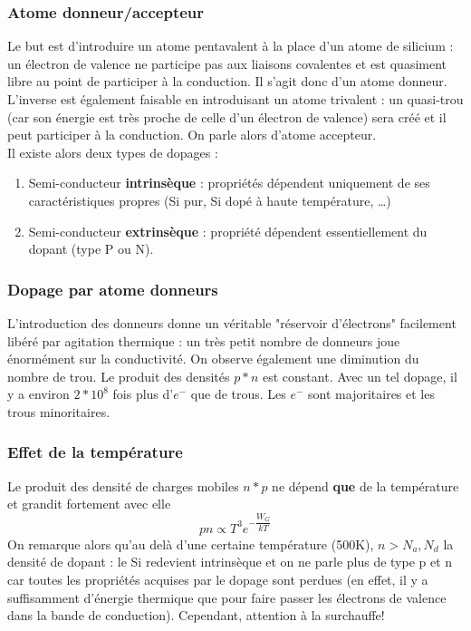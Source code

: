 		\subsubsection{Atome donneur/accepteur}
		Le but est d'introduire un atome pentavalent à la place d'un atome de 
		silicium : un électron de valence ne participe pas aux liaisons 
		covalentes et est quasiment libre au point de participer à la conduction. 
		Il s'agit donc d'un atome donneur. L'inverse est également faisable en 
		introduisant un atome trivalent : un quasi-trou (car son énergie est 
		très proche de celle d'un électron de valence) sera créé et il peut 
		participer à la conduction. On parle alors d'atome accepteur.\\
		Il existe alors deux types de dopages :
		\begin{enumerate}
		\item Semi-conducteur \textbf{intrinsèque} : propriétés dépendent 
		uniquement de ses caractéristiques propres (Si pur, Si dopé à haute 
		température, \dots)
		\item Semi-conducteur \textbf{extrinsèque} : propriété dépendent 
		essentiellement du dopant (type P ou N).
		\end{enumerate}


		\subsubsection{Dopage par atome donneurs}
		L'introduction des donneurs donne un véritable "réservoir d'électrons" 
		facilement libéré par agitation thermique : un très petit nombre de 
		donneurs joue énormément sur la conductivité. On observe également une 
		diminution du nombre de trou. Le produit des densités $p*n$ est constant. Avec un 
		tel dopage, il y a environ $2*10^ 8$ fois plus d'$e^-$ que de trous. Les 
		$e^-$ sont majoritaires et les trous minoritaires.
		
		\subsubsection{Effet de la température}
		Le produit des densité de charges mobiles $n*p$ ne dépend \textbf{que} 
		de la température et grandit fortement avec elle 
		\begin{equation}
		pn \propto T^3e^{-\dfrac{W_G}{kT}}
		\end{equation}
		On remarque alors qu'au delà d'une certaine température (500K), $n>N_a,N_d$ 
		la densité de dopant : le Si redevient intrinsèque et on ne parle plus de 
		type p et n car toutes les propriétés acquises par le dopage sont perdues 
		(en effet, il y a suffisamment d'énergie thermique que pour faire passer 
		les électrons de valence dans la bande de conduction). Cependant, attention 
		à la surchauffe!
		
